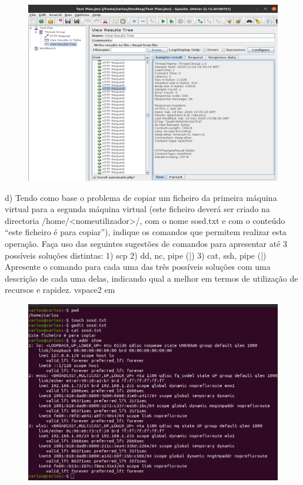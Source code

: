 \documentclass{article}
\begin{document}
	\newpage
	
	\begin{figure}[!htb]
		\centering
		\includegraphics[scale=0.5]{tp_sosd_c4}
	\end{figure}

	\newpage
	d) Tendo como base o problema de copiar um ficheiro da primeira máquina
	virtual para a segunda máquina virtual (este ficheiro deverá ser criado na
	directoria /home/<nomeutilizador>/, com o nome sosd.txt e com o conteúdo
	“este ficheiro é para copiar”), indique os comandos que permitem realizar esta
	operação.
	Faça uso das seguintes sugestões de comandos para apresentar até 3 possíveis
	soluções distintas:
	1) scp
	2) dd, nc, pipe (|)
	3) cat, ssh, pipe (|)
	Apresente o comando para cada uma das três possíveis soluções com uma
	descrição de cada uma delas, indicando qual a melhor em termos de utilização
	de recursos e rapidez.
	vspace{2 em}
	
	\begin{figure}[!htb]
		\centering
		\includegraphics[scale=0.5]{tp_sosd_d1}
	\end{figure}
	
\end{document}
